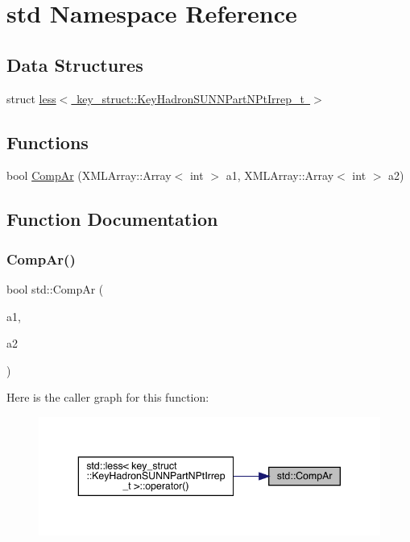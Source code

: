 \hypertarget{namespacestd}{}\section{std Namespace Reference}
\label{namespacestd}
\subsection*{Data Structures}
\begin{DoxyCompactItemize}
\item 
struct \mbox{\hyperlink{structstd_1_1less_3_01key__struct_1_1KeyHadronSUNNPartNPtIrrep__t_01_4}{less$<$ key\+\_\+struct\+::\+Key\+Hadron\+S\+U\+N\+N\+Part\+N\+Pt\+Irrep\+\_\+t $>$}}
\end{DoxyCompactItemize}
\subsection*{Functions}
\begin{DoxyCompactItemize}
\item 
bool \mbox{\hyperlink{namespacestd_a929d58c3bfc4ab4ec60de164536448f7}{Comp\+Ar}} (X\+M\+L\+Array\+::\+Array$<$ int $>$ a1, X\+M\+L\+Array\+::\+Array$<$ int $>$ a2)
\end{DoxyCompactItemize}


\subsection{Function Documentation}
\mbox{\label{namespacestd_a929d58c3bfc4ab4ec60de164536448f7}} 
\subsubsection{\texorpdfstring{CompAr()}{CompAr()}}
{\footnotesize\ttfamily bool std\+::\+Comp\+Ar (\begin{DoxyParamCaption}\item[{X\+M\+L\+Array\+::\+Array$<$ int $>$}]{a1,  }\item[{X\+M\+L\+Array\+::\+Array$<$ int $>$}]{a2 }\end{DoxyParamCaption})\hspace{0.3cm}{\ttfamily [inline]}}

Here is the caller graph for this function\+:
\nopagebreak
\begin{figure}[H]
\begin{center}
\leavevmode
\includegraphics[width=343pt]{d8/dcc/namespacestd_a929d58c3bfc4ab4ec60de164536448f7_icgraph}
\end{center}
\end{figure}
